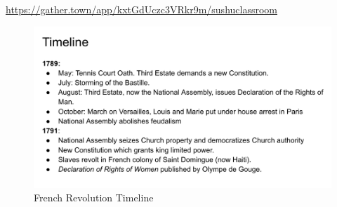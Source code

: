 \documentclass[letterpaper]{article}
\begin{document}
\url{https://gather.town/app/kxtGdUczc3VRkr9m/sushuclassroom}

\begin{figure}[htbp]
\centering
\includegraphics[width=.9\linewidth]{frenchrevtimeline.png}
\caption{French Revolution Timeline}
\end{figure}
\end{document}
